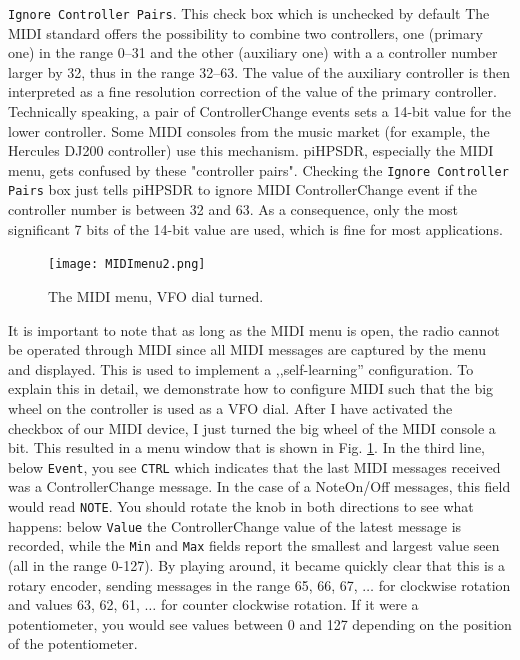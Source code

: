 \documentclass[12pt]{book}
\def\rett#1{\texttt{\color{red}#1}}
\def\pH{pi\-HPSDR\xspace}
\begin{document}
\rett{Ignore Controller Pairs}. This check box  which is unchecked by default
The MIDI standard offers the possibility to combine two controllers, one
(primary one) in the range 0--31 and the other (auxiliary one)
with a a controller number larger by 32, thus in
the range 32--63. The value of the auxiliary controller is then interpreted as a
fine resolution correction of the value of the primary controller. Technically
speaking,
a pair of ControllerChange events sets a 14-bit value for the lower controller.
Some MIDI consoles
from the music market (for example, the Hercules DJ200 controller)
use this mechanism. \pH, especially the MIDI menu, gets confused
by these "controller pairs". Checking the \rett{Ignore Controller Pairs} box just tells
\pH to ignore MIDI ControllerChange event if the controller number is between 32 and 63.
As a consequence, only the most significant 7 bits of the 14-bit value are used, which
is fine for most applications.

\begin{figure}[ht]
\center
\texttt{[image: MIDImenu2.png]}
\caption{The MIDI menu, VFO dial turned.}
\label{fig:MIDImenu2}
\end{figure}

It is important to note that as long as the MIDI menu is open, the radio cannot be
operated through MIDI since all MIDI messages are captured by the menu and
displayed. This is used to implement a ,,self-learning'' configuration. To explain
this in detail, we demonstrate how to configure MIDI such that the big wheel on the
controller is used as a VFO dial. After I have activated the checkbox of our
MIDI device, I just turned the big wheel of the MIDI console a bit. This resulted
in a menu window that is shown in Fig. \ref{fig:MIDImenu2}. In the third line,
below \rett{Event}, you see \texttt{CTRL} which indicates that the last MIDI messages
received was a ControllerChange message. In the case of a NoteOn/Off messages, this
field would read \texttt{NOTE}. You should rotate the knob in both directions to
see what happens: below \rett{Value} the ControllerChange value of the latest
message is recorded, while the \rett{Min} and \rett{Max} fields report the smallest
and largest value seen (all in the range 0-127). By playing around, it became
quickly clear that this is a rotary encoder, sending messages in the range 65, 66, 67,
$\ldots$ for clockwise rotation and values 63, 62, 61, $\ldots$ for counter clockwise
rotation. If it were a potentiometer, you would see values between 0 and 127
depending on the position of the potentiometer.
\end{document}
